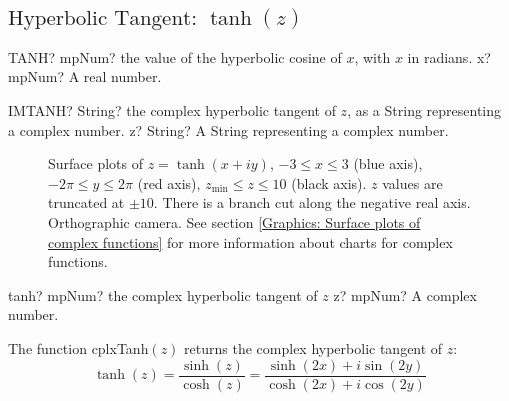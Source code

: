 \newpage
\subsection{\texorpdfstring{$\text{Hyperbolic Tangent: }\tanh(z)$}{tanh}}

\begin{mpFunctionsExtract}
	\mpWorksheetFunctionOneNotImplemented
	{TANH? mpNum? the value of the hyperbolic cosine of $x$, with $x$ in radians.}
	{x? mpNum? A real number.}
\end{mpFunctionsExtract}


\vspace{0.6cm}
\begin{mpFunctionsExtract}
	\mpWorksheetFunctionOneNotImplemented
	{IMTANH? String? the complex hyperbolic tangent of $z$, as a String representing a complex number.}
	{z? String? A String representing a complex number.}
\end{mpFunctionsExtract}




\begin{figure}[ht]%
	\centering
	\qquad
	\caption[Complex Hyperbolic Tangent]{Surface plots of $z = \tanh(x + iy)$, $-3 \leq x \leq 3$ (blue axis), $-2 \pi \leq y \leq 2\pi$ (red axis), $z_{\text{min}} \leq z \leq 10$ (black axis). $z$ values are truncated at $\pm 10$. There is a branch cut along the negative real axis. Orthographic camera. See section \ref{Graphics: Surface plots of complex functions} for more information about charts for complex functions.} 
	\label{fig:Complex Hyperbolic Tangent}%
\end{figure}


\begin{mpFunctionsExtract}
	\mpFunctionOne
	{tanh? mpNum? the complex hyperbolic tangent of $z$}
	{z? mpNum? A complex number.}
\end{mpFunctionsExtract}

\vspace{0.3cm}
The function \textsf{cplxTanh$(z)$} returns the complex hyperbolic tangent of $z$: 
\begin{equation}
	\tanh(z) =\frac{\sinh(z)}{\cosh(z)} = \frac{\sinh(2x)+i \sin(2y)}{\cosh(2x)+i \cos(2y)}
\end{equation}

